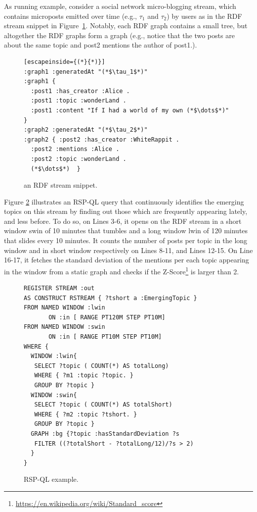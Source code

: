 As running example, consider a social network micro-blogging stream, which
contains microposts emitted over time (e.g., $\tau_1$ and $\tau_2$) by users as in the RDF stream snippet in Figure~\ref{fig:rdfstream}. Notably, each RDF graph contains a small tree, but altogether the RDF graphs form a graph (e.g., notice that the two posts are about the same topic and \textsf{post2} mentions the author of \textsf{post1}.).

\begin{figure}[!h]
\begin{lstlisting}[escapeinside={(*}{*)}]
:graph1 :generatedAt "(*$\tau_1$*)"
:graph1 { 
  :post1 :has_creator :Alice .
  :post1 :topic :wonderLand .
  :post1 :content "If I had a world of my own (*$\dots$*)" }
:graph2 :generatedAt "(*$\tau_2$*)" 
:graph2 { :post2 :has_creator :WhiteRappit .
  :post2 :mentions :Alice .
  :post2 :topic :wonderLand .
  (*$\dots$*)  }  
\end{lstlisting}
\vspace*{-4mm}
\caption{\label{fig:rdfstream}an RDF stream snippet.}
\end{figure}

Figure \ref{fig:rspql} illustrates an RSP-QL query that continuously identifies the emerging topics on this stream by finding out those which are frequently appearing lately, and less before. To do so, on Lines 3-6, it opens  on the RDF stream \textsf{in} a short window \textsf{swin} of 10 minutes that tumbles and a long window \textsf{lwin} of 120 minutes that slides every 10 minutes. It counts the number of posts per topic in the long window and in short window respectively on Lines 8-11, and Lines 12-15. On Line 16-17, it fetches the standard deviation of the mentions per each topic appearing in the window from a static graph and checks if the Z-Score\footnote{\url{https://en.wikipedia.org/wiki/Standard_score}} is larger than 2. 

\begin{figure}[!h]
\begin{lstlisting}[language=rsp-ql]
REGISTER STREAM :out
AS CONSTRUCT RSTREAM { ?tshort a :EmergingTopic }
FROM NAMED WINDOW :lwin 
       ON :in [ RANGE PT120M STEP PT10M]
FROM NAMED WINDOW :swin 
       ON :in [ RANGE PT10M STEP PT10M]
WHERE { 
  WINDOW :lwin{
   SELECT ?topic ( COUNT(*) AS totalLong)
   WHERE { ?m1 :topic ?topic. }
   GROUP BY ?topic }
  WINDOW :swin{
   SELECT ?topic ( COUNT(*) AS totalShort)
   WHERE { ?m2 :topic ?tshort. }
   GROUP BY ?topic }
  GRAPH :bg {?topic :hasStandardDeviation ?s 
   FILTER ((?totalShort - ?totalLong/12)/?s > 2)
  }
}
\end{lstlisting}
\vspace*{-4mm}
\caption{\label{fig:rspql}RSP-QL example.}
\end{figure}

